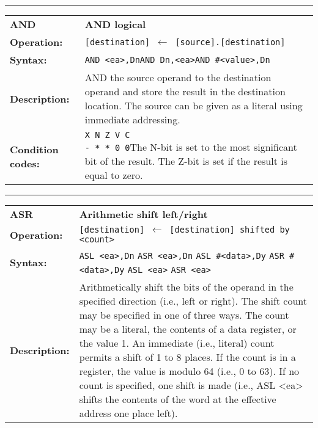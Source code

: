\documentclass[]{article}
\begin{document}
\begin{appendices}
\newpage

\noindent\rule{10cm}{1pt}\newline %
\setlength\extrarowheight{5pt} %
\begin{tabularx}{\textwidth}{lL}
  {\Large \textbf{AND}} 	& {\Large \textbf{AND logical}}\\
  \textbf{Operation:} 		& \texttt{[destination] $\leftarrow$ [source].[destination]}\\
  \textbf{Syntax:}  		& \texttt{AND <ea>,Dn}\newline\texttt{AND Dn,<ea>}\newline\texttt{AND \#<value>,Dn}\\
  \textbf{Description:}  	& AND the source operand to the destination operand and store the
result in the destination location. The source can be given as a literal using immediate addressing.\\
  \textbf{Condition codes:} & \texttt{X N Z V C\newline - * * 0 0}\newline\newline The N-bit is set to the most significant bit of the result. The Z-bit is set if the result is equal to zero.\\
\end{tabularx}
\newline

\newpage

\noindent\rule{10cm}{1pt}\newline %
\setlength\extrarowheight{5pt} %
\begin{tabularx}{\textwidth}{lL}
  {\Large \textbf{ASR}} 	& {\Large \textbf{Arithmetic shift left/right}}\\
  \textbf{Operation:} 		& \texttt{[destination] $\leftarrow$ [destination] shifted by <count>}\\
  \textbf{Syntax:}  		& \texttt{ASL <ea>,Dn}\newline
  							  \texttt{ASR <ea>,Dn}\newline
 							  \texttt{ASL \#<data>,Dy}\newline
 							  \texttt{ASR \#<data>,Dy}\newline
 							  \texttt{ASL <ea>}\newline
 							  \texttt{ASR <ea>}\newline 							  
 							  \\
  \textbf{Description:}  	& Arithmetically shift the bits of the operand in the specified direction
(i.e., left or right). The shift count may be specified in one of
three ways. The count may be a literal, the contents of a data
register, or the value 1. An immediate (i.e., literal) count permits
a shift of 1 to 8 places. If the count is in a register, the value is
modulo 64 (i.e., 0 to 63). If no count is specified, one shift is made
(i.e., ASL <ea> shifts the contents of the word at the effective
address one place left).


\end{tabularx}
\end{appendices}
\end{document}
